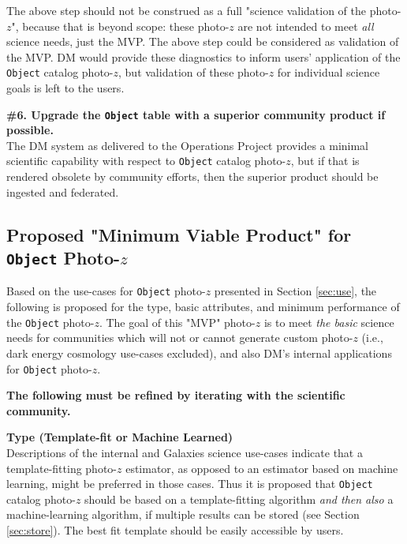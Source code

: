 \documentclass[DM,lsstdraft,toc]{lsstdoc}
\begin{document}
The above step should not be construed as a full "science validation of the photo-$z$", because that is beyond scope: these photo-$z$ are not intended to meet {\it all} science needs, just the MVP.
The above step could be considered as validation of the MVP.
DM would provide these diagnostics to inform users' application of the {\tt Object} catalog photo-$z$, but validation of these photo-$z$ for individual science goals is left to the users.

{\bf \#6. Upgrade the {\tt Object} table with a superior community product if possible.}\\
The DM system as delivered to the Operations Project provides a minimal scientific capability with respect to {\tt Object} catalog photo-$z$, but if that is rendered obsolete by community efforts, then the superior product should be ingested and federated.


\subsection{Proposed "Minimum Viable Product" for {\tt Object} Photo-$z$}\label{ssec:dmcalc_mvp}

Based on the use-cases for {\tt Object} photo-$z$ presented in Section \ref{sec:use}, the following is proposed for the type, basic attributes, and minimum performance of the {\tt Object} photo-$z$.
The goal of this "MVP" photo-$z$ is to meet {\it the basic} science needs for communities which will not or cannot generate custom photo-$z$ (i.e., dark energy cosmology use-cases excluded), and also DM's internal applications for {\tt Object} photo-$z$.

{\bf The following must be refined by iterating with the scientific community.}

{\bf Type (Template-fit or Machine Learned)}\\
Descriptions of the internal and Galaxies science use-cases indicate that a template-fitting photo-$z$ estimator, as opposed to an estimator based on machine learning, might be preferred in those cases.
Thus it is proposed that  {\tt Object} catalog photo-$z$ should be based on a template-fitting algorithm {\it and then also} a machine-learning algorithm, if multiple results can be stored (see Section \ref{sec:store}).
The best fit template should be easily accessible by users. 
\end{document}
